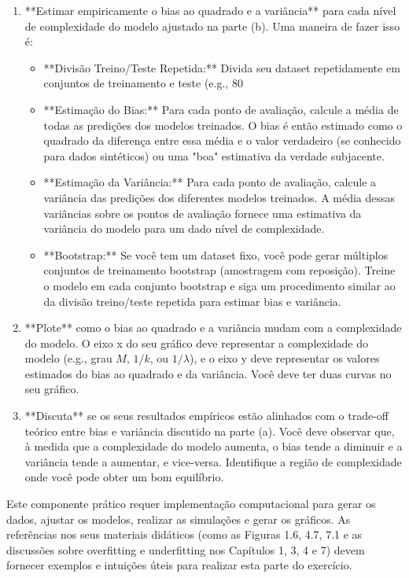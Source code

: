 \documentclass{article}
\begin{document}
\begin{enumerate}
    \item **Estimar empiricamente o bias ao quadrado e a variância** para cada nível de complexidade do modelo ajustado na parte (b). Uma maneira de fazer isso é:
    \begin{itemize}
        \item **Divisão Treino/Teste Repetida:** Divida seu dataset repetidamente em conjuntos de treinamento e teste (e.g., 80%
        \item **Estimação do Bias:** Para cada ponto de avaliação, calcule a média de todas as predições dos modelos treinados. O bias é então estimado como o quadrado da diferença entre essa média e o valor verdadeiro (se conhecido para dados sintéticos) ou uma "boa" estimativa da verdade subjacente.
        \item **Estimação da Variância:** Para cada ponto de avaliação, calcule a variância das predições dos diferentes modelos treinados. A média dessas variâncias sobre os pontos de avaliação fornece uma estimativa da variância do modelo para um dado nível de complexidade.
        \item **Bootstrap:** Se você tem um dataset fixo, você pode gerar múltiplos conjuntos de treinamento bootstrap (amostragem com reposição). Treine o modelo em cada conjunto bootstrap e siga um procedimento similar ao da divisão treino/teste repetida para estimar bias e variância.
    \end{itemize}
    \item **Plote** como o bias ao quadrado e a variância mudam com a complexidade do modelo. O eixo x do seu gráfico deve representar a complexidade do modelo (e.g., grau $M$, $1/k$, ou $1/\lambda$), e o eixo y deve representar os valores estimados do bias ao quadrado e da variância. Você deve ter duas curvas no seu gráfico.
    \item **Discuta** se os seus resultados empíricos estão alinhados com o trade-off teórico entre bias e variância discutido na parte (a). Você deve observar que, à medida que a complexidade do modelo aumenta, o bias tende a diminuir e a variância tende a aumentar, e vice-versa. Identifique a região de complexidade onde você pode obter um bom equilíbrio.

\end{enumerate}

Este componente prático requer implementação computacional para gerar os dados, ajustar os modelos, realizar as simulações e gerar os gráficos. As referências nos seus materiais didáticos (como as Figuras 1.6, 4.7, 7.1 e as discussões sobre overfitting e underfitting nos Capítulos 1, 3, 4 e 7) devem fornecer exemplos e intuições úteis para realizar esta parte do exercício.
\end{document}
